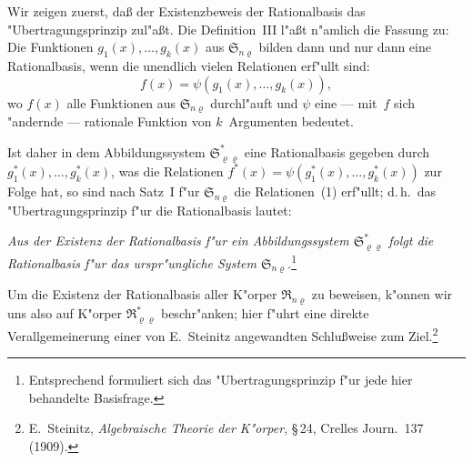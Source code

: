 \documentclass[11pt,a4paper]{article}
\begin{document}
Wir zeigen zuerst, da\ss{} der Existenzbeweis der Rationalbasis das
"{U}bertragungsprinzip zul"{a}\ss{}t. Die Definition~III l"{a}\ss{}t n"{a}mlich die Fassung zu:
Die Funktionen $g_{1}(x),\dots,g_{k}(x)$ aus $\mathfrak{S}_{n\varrho}$ bilden dann und nur dann
eine Rationalbasis, wenn die unendlich vielen Relationen erf"{u}llt sind:
\begin{equation}
f(x)=\psi(g_{1}(x),\dots,g_{k}(x)),
\tag{1}
\end{equation}
wo $f(x)$ alle Funktionen aus $\mathfrak{S}_{n\varrho}$ durchl"{a}uft und $\psi$ eine --- mit~$f$ sich
"{a}ndernde --- rationale Funktion von $k$~Argumenten bedeutet.

Ist daher in dem Abbildungssystem $\mathfrak{S}_{\varrho\varrho}^{*}$ eine Rationalbasis gegeben
durch $g_{1}^{*}(x),\dots,g_{k}^{*}(x)$, was die Relationen $f^{*}(x)=\psi(g_{1}^{*}(x),\dots,g_{k}^{*}(x))$
zur Folge hat, so sind nach Satz~I f"{u}r $\mathfrak{S}_{n\varrho}$ die Relationen~(1) erf"{u}llt;
d.\,h.\ das "{U}bertragungsprinzip f"{u}r die Rationalbasis lautet:

\smallskip
\emph{Aus der Existenz der Rationalbasis f"{u}r ein Abbildungssystem
$\mathfrak{S}_{\varrho\varrho}^{*}$ folgt die Rationalbasis f"{u}r das urspr"{u}ngliche System $\mathfrak{S}_{n\varrho}$.}\footnote{Entsprechend
formuliert sich das "{U}bertragungsprinzip f"{u}r jede hier behandelte Basisfrage.}

Um die Existenz der Rationalbasis aller K"{o}rper $\mathfrak{R}_{n\varrho}$ zu beweisen,
k"{o}nnen wir uns also auf K"{o}rper $\mathfrak{R}_{\varrho\varrho}^{*}$ beschr"{a}nken; hier f"{u}hrt eine direkte
Verallgemeinerung einer von E.~Steinitz angewandten Schlu\ss{}weise zum
Ziel.\footnote{E.~Steinitz, \emph{Algebraische Theorie der K"{o}rper}, \S\,24, Crelles Journ.\ 137 (1909).}
\end{document}
